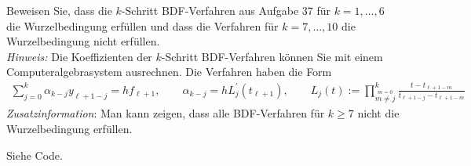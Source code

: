 \begin{exercise}
Beweisen Sie, dass die $k$-Schritt BDF-Verfahren aus Aufgabe 37 für $k = 1,\dots,6$
die Wurzelbedingung erfüllen und dass die Verfahren für $k = 7,\dots,10$
die Wurzelbedingung nicht erfüllen. \\
\textit{Hinweis:} Die Koeffizienten der $k$-Schritt BDF-Verfahren können Sie mit
einem Computeralgebrasystem ausrechnen. Die Verfahren haben die Form
\begin{align}
  \sum_{j= 0}^k \alpha_{k - j}y_{\ell + 1 - j} = hf_{\ell + 1}, \qquad
  \alpha_{k - j} = hL_j^{\prime}(t_{\ell + 1}), \qquad
  L_j(t) := \prod_{\stackrel{m = 0}{m \neq j}}^k \frac{t - t_{\ell + 1 -m}}{t_{\ell + 1 - j} - t_{\ell + 1 - m}}
\end{align}
\textit{Zusatzinformation}: Man kann zeigen, dass alle BDF-Verfahren für $k \geq 7$
nicht die Wurzelbedingung erfüllen.
\end{exercise}
\begin{solution}
Siehe Code.
\end{solution}
